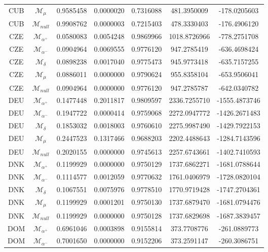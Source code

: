 \begin{tabular}{ccccccc}
CUB & $\mathcal{M}_{\mu}$ & 0.9585458 & 0.0000020 & 0.7316088 & 481.3950009 & -178.0205603\\
CUB & $\mathcal{M}_{null}$ & 0.9908762 & 0.0000003 & 0.7215403 & 478.3330403 & -176.4906120\\
CZE & $\mathcal{M}_{\alpha^+}$ & 0.0580083 & 0.0054248 & 0.9869966 & 1018.8726966 & -778.2751708\\
CZE & $\mathcal{M}_{\alpha^-}$ & 0.0904964 & 0.0069555 & 0.9776120 & 947.2785419 & -636.4698424\\
CZE & $\mathcal{M}_{\delta}$ & 0.0898238 & 0.0017040 & 0.9775473 & 945.9773418 & -635.7157255\\
CZE & $\mathcal{M}_{\mu}$ & 0.0886011 & 0.0000000 & 0.9790624 & 955.8358104 & -653.9506041\\
CZE & $\mathcal{M}_{null}$ & 0.0904964 & 0.0000000 & 0.9776120 & 947.2785787 & -642.0340782\\
DEU & $\mathcal{M}_{\alpha^+}$ & 0.1477448 & 0.2011817 & 0.9809597 & 2336.7255710 & -1555.4873746\\
DEU & $\mathcal{M}_{\alpha^-}$ & 0.1947722 & 0.0000414 & 0.9759068 & 2272.0947772 & -1426.2671483\\
DEU & $\mathcal{M}_{\delta}$ & 0.1853032 & 0.0018003 & 0.9760610 & 2275.9987490 & -1429.7922153\\
DEU & $\mathcal{M}_{\mu}$ & 0.2447523 & 0.1317466 & 0.9688203 & 2202.4488643 & -1284.7143596\\
DEU & $\mathcal{M}_{null}$ & 0.2020155 & 0.0000000 & 0.9745613 & 2257.6743661 & -1402.7410593\\
DNK & $\mathcal{M}_{\alpha^+}$ & 0.1199929 & 0.0000000 & 0.9750129 & 1737.6862271 & -1681.0788644\\
DNK & $\mathcal{M}_{\alpha^-}$ & 0.1114577 & 0.0012059 & 0.9770632 & 1761.0406979 & -1728.0820104\\
DNK & $\mathcal{M}_{\delta}$ & 0.1067551 & 0.0075976 & 0.9778510 & 1770.9719428 & -1747.2704361\\
DNK & $\mathcal{M}_{\mu}$ & 0.1199929 & 0.0001201 & 0.9750130 & 1737.6879470 & -1681.0794476\\
DNK & $\mathcal{M}_{null}$ & 0.1199929 & 0.0000000 & 0.9750128 & 1737.6829698 & -1687.3839457\\
DOM & $\mathcal{M}_{\alpha^+}$ & 0.6961046 & 0.0003898 & 0.9155814 & 373.7708776 & -261.0889773\\
DOM & $\mathcal{M}_{\alpha^-}$ & 0.7001650 & 0.0000000 & 0.9152206 & 373.2591147 & -260.3086751\\

\end{tabular}
